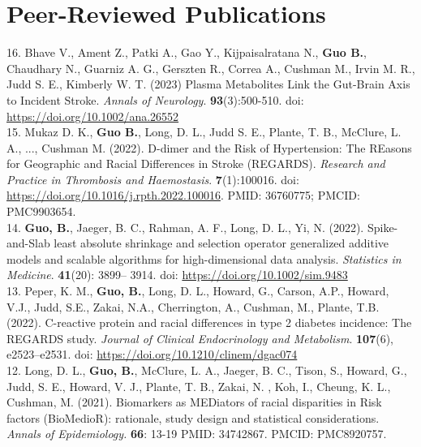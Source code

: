 \section{Peer-Reviewed Publications}

\vspace{-3ex}


16. Bhave V., Ament Z., Patki A., Gao Y., Kijpaisalratana N., \textbf{Guo B.}, Chaudhary N., Guarniz A. G., Gerszten R., Correa A., Cushman M., Irvin M. R., Judd S. E., Kimberly W. T. (2023) Plasma Metabolites Link the Gut-Brain Axis to Incident Stroke. {\it Annals of Neurology}. {\bf 93}(3):500-510.  doi: \url{https://doi.org/10.1002/ana.26552}\\

15. Mukaz D. K., \textbf{Guo B.}, Long, D. L., Judd S. E., Plante, T. B., McClure, L. A., ...,  Cushman M. (2022). D-dimer and the Risk of Hypertension: The REasons for Geographic and Racial Differences in Stroke (REGARDS). \textit{Research and Practice in Thrombosis and Haemostasis}. {\bf 7}(1):100016. doi: \url{https://doi.org/10.1016/j.rpth.2022.100016}. PMID: 36760775; PMCID: PMC9903654.\\

14. \textbf{Guo, B.}, Jaeger, B. C., Rahman, A. F., Long, D. L., Yi, N. (2022). Spike-and-Slab least absolute shrinkage and selection operator generalized additive models and scalable algorithms for high-dimensional data analysis. {\it Statistics in Medicine}. {\bf 41}(20): 3899– 3914. doi: \url{https://doi.org/10.1002/sim.9483}\\

13. Peper, K. M., \textbf{Guo, B.}, Long, D. L., Howard, G., Carson, A.P., Howard, V.J., Judd, S.E., Zakai, N.A., Cherrington, A., Cushman, M., Plante, T.B. (2022). C-reactive protein and racial differences in type 2 diabetes incidence: The REGARDS study. {\it Journal of Clinical Endocrinology and Metabolism}. {\bf 107}(6), e2523–e2531. doi: \url{https://doi.org/10.1210/clinem/dgac074}\\

12. Long, D. L., \textbf{Guo, B.}, McClure, L. A., Jaeger, B. C., Tison, S., Howard, G., Judd, S. E., Howard, V. J., Plante, T. B., Zakai, N. , Koh, I., Cheung, K. L., Cushman, M. (2021). Biomarkers as MEDiators of racial disparities in Risk factors (BioMedioR): rationale, study design and statistical considerations. \textit{Annals of Epidemiology.} {\bf 66}: 13-19 PMID: 34742867. PMCID: PMC8920757. \\

